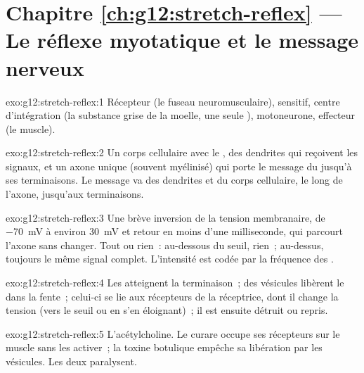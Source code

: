 \section*{Chapitre \ref{ch:g12:stretch-reflex} --- Le réflexe myotatique et le message nerveux}

\begin{solution}{exo:g12:stretch-reflex:1}
Récepteur (le fuseau neuromusculaire),  sensitif, centre
d'intégration (la substance grise de la moelle, une seule ),
motoneurone, effecteur (le muscle).
\end{solution}

\begin{solution}{exo:g12:stretch-reflex:2}
Un corps cellulaire avec le , des dendrites qui reçoivent les
signaux, et un axone unique (souvent myélinisé) qui porte le message
du  jusqu'à ses terminaisons. Le message va des dendrites et du
corps cellulaire, le long de l'axone, jusqu'aux terminaisons.
\end{solution}

\begin{solution}{exo:g12:stretch-reflex:3}
Une brève inversion de la tension membranaire, de \qty{-70}{mV} à
environ \qty{+30}{mV} et retour en moins d'une milliseconde, qui
parcourt l'axone sans changer. Tout ou rien~: au-dessous du seuil,
rien~; au-dessus, toujours le même signal complet. L'intensité est
codée par la fréquence des .
\end{solution}

\begin{solution}{exo:g12:stretch-reflex:4}
Les  atteignent la terminaison~; des vésicules
libèrent le  dans la fente~; celui-ci se lie aux
récepteurs de la  réceptrice, dont il change la tension (vers
le seuil ou en s'en éloignant)~; il est ensuite détruit ou repris.
\end{solution}

\begin{solution}{exo:g12:stretch-reflex:5}
L'acétylcholine. Le curare occupe ses récepteurs sur le muscle sans
les activer~; la toxine botulique empêche sa libération par les
vésicules. Les deux paralysent.
\end{solution}

